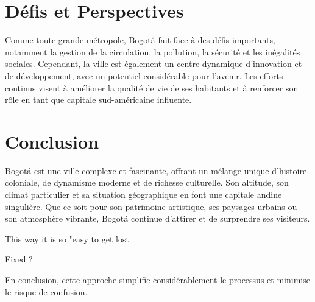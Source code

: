 \documentclass{article}
\begin{document}
\section{Défis et Perspectives}
Comme toute grande métropole, Bogotá fait face à des défis importants, notamment la gestion de la circulation, la pollution, la sécurité et les inégalités sociales. Cependant, la ville est également un centre dynamique d'innovation et de développement, avec un potentiel considérable pour l'avenir. Les efforts continus visent à améliorer la qualité de vie de ses habitants et à renforcer son rôle en tant que capitale sud-américaine influente.

\section{Conclusion}
Bogotá est une ville complexe et fascinante, offrant un mélange unique d'histoire coloniale, de dynamisme moderne et de richesse culturelle. Son altitude, son climat particulier et sa situation géographique en font une capitale andine singulière. Que ce soit pour son patrimoine artistique, ses paysages urbains ou son atmosphère vibrante, Bogotá continue d'attirer et de surprendre ses visiteurs.

This way it is so "easy to get lost

Fixed ?

En conclusion, cette approche simplifie considérablement le processus et minimise le risque de confusion.
\end{document}
